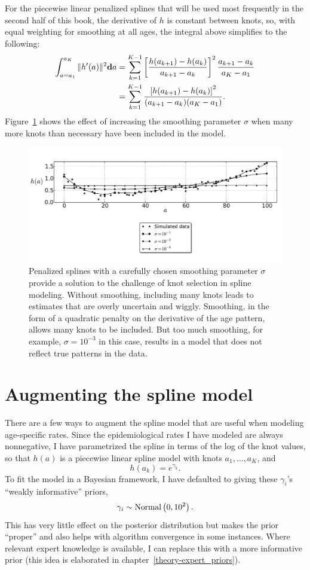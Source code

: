 For the piecewise linear penalized splines that will be used most
frequently in the second half of this book, the derivative of $h$ is
constant between knots, so, with equal weighting for smoothing at all
ages, the integral above simplifies to the following:
\begin{align*}
\int _{a=a_1} ^{a_K} \| h'(a) \|^2 \mathbf{d} a
& = \sum_{k=1} ^{K-1} \left[\frac{h(a_{k+1}) - h(a_k)}{a_{k+1}-a_k}\right]^2 \frac{a_{k+1}-a_k}{a_K - a_1}\\
&= \sum_{k=1} ^{K-1} \frac{\left[h(a_{k+1}) - h(a_k)\right]^2}{(a_{k+1}-a_k)(a_K - a_1)}.
\end{align*}
Figure~\ref{smoothing-splines} shows the effect of increasing the
smoothing parameter $\sigma$ when many more knots than necessary have been included in the model.

\begin{figure}[h]
\begin{center}
\includegraphics[width=\textwidth]{smoothing-splines.pdf}
\caption{Penalized splines with a carefully chosen smoothing parameter
  $\sigma$ provide a solution to the challenge of knot selection in
  spline modeling.  Without smoothing, including many knots leads to
  estimates that are overly uncertain and wiggly.  Smoothing, in the
  form of a quadratic penalty on the derivative of the age pattern,
  allows many knots to be included.  But too much smoothing, for
  example, $\sigma=10^{-3}$ in this case, results in a model that does
  not reflect true patterns in the data.}
\label{smoothing-splines}
\end{center}
\end{figure}


\section{Augmenting the spline model}
There are a few ways to augment the spline model that are useful when
modeling age-specific rates. Since the epidemiological rates I have modeled
are always nonnegative, I have parametrized the spline in
terms of the log of the knot values, so that $h(a)$ is a piecewise
linear spline model with knots $a_1,\ldots,a_K$, and
\[
h(a_k) = e^{\gamma_k}.
\]
To fit the model in a Bayesian framework, I have defaulted to
giving these $\gamma_i$'s ``weakly informative'' priors,
\[
\gamma_i \sim \operatorname{Normal}\left(0, 10^2\right).
\]
This has very little effect on the posterior distribution but makes
the prior ``proper'' and also helps with algorithm convergence in
some instances. Where relevant expert knowledge is
available, I can replace this with a more informative prior (this idea
is elaborated in chapter~\ref{theory-expert_priors}).

